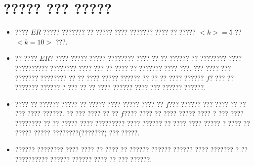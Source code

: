  \section{????? ??? ?????}
 \begin{itemize}
 \item ???? $ER$ ????? ??????? ?? ????? ???? ??????? ???? ?? ????? $<k> = 5$ ?? $<k = 10>$ ???. 
 \item ?? ???? $ER$? ???? ????? ????? ???????? ???? ?? ?? ?????? ?? ???????? ???? ?????????? ???????? ???? ??? ?? ???? ?? ??????? ???? ???. ??? ???? ??? ??????? ???????? ?? ?? ???? ????? ?????? ?? ?? ?? ???? ?????? $f$? ??? ?? ??????? ?????? ? ??? ?? ?? ???? ?????? ???? ??? ?????? ??????.
 \item ???? ?? ?????? ????? ?? ????? ???? ?????  ???? ?? $f$??? ?????? ??? ???? ?? ?? ??? ???? ??????. ?? ??? ???? ?? ?? $f$???? ???? ?? ????  ????? ???? ? ??? ???? ???????? ?? ?? ????? ???? ????????? ???? ?????? ?? ???? ???? ????? ? ???? ?? ????? ????? ????????(???????) ??? ?????.
 \item ?????? ???????? ???? ???? ?? ???? ?? ?????? ?????? ?????? ???? ??????? ? ?? ?????????? ?????? ?????? ???? ?? ??? ??????.
 \end{itemize} 






